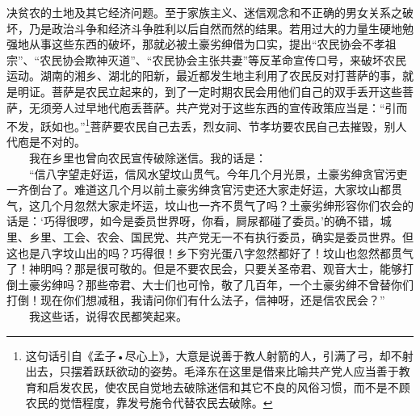 \documentclass[cn,11pt,chinese]{elegantbook}
\begin{document}
决贫农的土地及其它经济问题。至于家族主义、迷信观念和不正确的男女关系之破坏，乃是政治斗争和经济斗争胜利以后自然而然的结果。若用过大的力量生硬地勉强地从事这些东西的破坏，那就必被土豪劣绅借为口实，提出“农民协会不孝祖宗”、“农民协会欺神灭道”、“农民协会主张共妻”等反革命宣传口号，来破坏农民运动。湖南的湘乡、湖北的阳新，最近都发生地主利用了农民反对打菩萨的事，就是明证。菩萨是农民立起来的，到了一定时期农民会用他们自己的双手丢开这些菩萨，无须旁人过早地代庖丢菩萨。共产党对于这些东西的宣传政策应当是：“引而不发，跃如也。”\footnote[18]{ 这句话引自《孟子•尽心上》，大意是说善于教人射箭的人，引满了弓，却不射出去，只摆着跃跃欲动的姿势。毛泽东在这里是借来比喻共产党人应当善于教育和启发农民，使农民自觉地去破除迷信和其它不良的风俗习惯，而不是不顾农民的觉悟程度，靠发号施令代替农民去破除。}菩萨要农民自己去丢，烈女祠、节孝坊要农民自己去摧毁，别人代庖是不对的。\\
　　我在乡里也曾向农民宣传破除迷信。我的话是：\\
　　“信八字望走好运，信风水望坟山贯气。今年几个月光景，土豪劣绅贪官污吏一齐倒台了。难道这几个月以前土豪劣绅贪官污吏还大家走好运，大家坟山都贯气，这几个月忽然大家走坏运，坟山也一齐不贯气了吗？土豪劣绅形容你们农会的话是：‘巧得很啰，如今是委员世界呀，你看，屙尿都碰了委员。’的确不错，城里、乡里、工会、农会、国民党、共产党无一不有执行委员，确实是委员世界。但这也是八字坟山出的吗？巧得很！乡下穷光蛋八字忽然都好了！坟山也忽然都贯气了！神明吗？那是很可敬的。但是不要农民会，只要关圣帝君、观音大士，能够打倒土豪劣绅吗？那些帝君、大士们也可怜，敬了几百年，一个土豪劣绅不曾替你们打倒！现在你们想减租，我请问你们有什么法子，信神呀，还是信农民会？”\\
　　我这些话，说得农民都笑起来。\\
\end{document}
